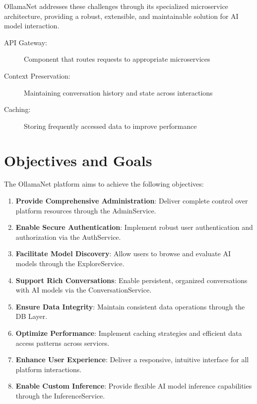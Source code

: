 OllamaNet addresses these challenges through its specialized microservice architecture, providing a robust, extensible, and maintainable solution for AI model interaction.

\begin{terminology}
\begin{description}
    \item[API Gateway:] Component that routes requests to appropriate microservices
    \item[Context Preservation:] Maintaining conversation history and state across interactions
    \item[Caching:] Storing frequently accessed data to improve performance
\end{description}
\end{terminology}

\section{Objectives and Goals}

The OllamaNet platform aims to achieve the following objectives:

\begin{enumerate}
    \item \textbf{Provide Comprehensive Administration}: Deliver complete control over platform resources through the AdminService.
    \item \textbf{Enable Secure Authentication}: Implement robust user authentication and authorization via the AuthService.
    \item \textbf{Facilitate Model Discovery}: Allow users to browse and evaluate AI models through the ExploreService.
    \item \textbf{Support Rich Conversations}: Enable persistent, organized conversations with AI models via the ConversationService.
    \item \textbf{Ensure Data Integrity}: Maintain consistent data operations through the DB Layer.
    \item \textbf{Optimize Performance}: Implement caching strategies and efficient data access patterns across services.
    \item \textbf{Enhance User Experience}: Deliver a responsive, intuitive interface for all platform interactions.
    \item \textbf{Enable Custom Inference}: Provide flexible AI model inference capabilities through the InferenceService.
\end{enumerate}

